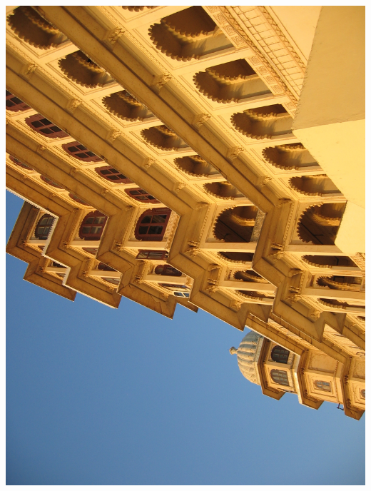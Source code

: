 %
\newpage\vspace*{-5cm}
\thispagestyle{empty}
\hspace*{-3.5cm}
\includegraphics[width=15.9cm]{articles/pagesCentrales/inde288.jpg}

